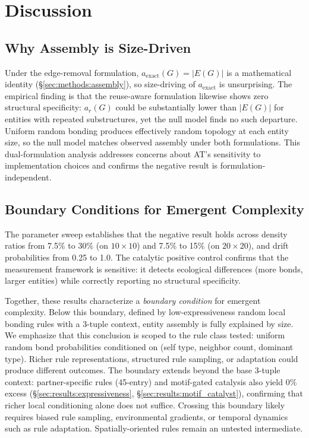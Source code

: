 \documentclass[letterpaper]{article}
\begin{document}
\section{Discussion}

\subsection{Why Assembly is Size-Driven}

Under the edge-removal formulation, $a_{\text{exact}}(G) = |E(G)|$ is
a mathematical identity (\S\ref{sec:methods:assembly}), so size-driving
of $a_{\text{exact}}$ is unsurprising. The empirical finding is that
the reuse-aware formulation likewise shows zero structural specificity:
$a_r(G)$ could be substantially lower than $|E(G)|$ for entities with
repeated substructures, yet the null model finds no such departure.
Uniform random bonding produces effectively random topology at each
entity size, so the null model matches observed assembly under both
formulations. This dual-formulation analysis addresses concerns about
AT's sensitivity to implementation choices
\citep{uthamacumaran2024assembly} and confirms the negative result is
formulation-independent.

\subsection{Boundary Conditions for Emergent Complexity}

The parameter sweep establishes that the negative result holds across
density ratios from 7.5\% to 30\% (on $10 \times 10$) and 7.5\% to
15\% (on $20 \times 20$), and drift probabilities from 0.25 to 1.0. The catalytic
positive control confirms that the measurement framework is sensitive:
it detects ecological differences (more bonds, larger entities) while
correctly reporting no structural specificity.

Together, these results characterize a \emph{boundary condition} for
emergent complexity. Below this boundary, defined by low-expressiveness
random local bonding rules with a 3-tuple context, entity assembly is
fully explained by size. We emphasize that this conclusion is scoped to
the rule class tested: uniform random bond probabilities conditioned on
(self type, neighbor count, dominant type). Richer rule representations,
structured rule sampling, or adaptation could produce different outcomes.
The boundary extends beyond the base 3-tuple context: partner-specific
rules (45-entry) and motif-gated catalysis also yield 0\% excess
(\S\ref{sec:results:expressiveness}, \S\ref{sec:results:motif_catalyst}),
confirming that richer local conditioning alone does not suffice.
Crossing this boundary likely requires biased rule sampling,
environmental gradients, or temporal dynamics such as rule adaptation.
Spatially-oriented rules remain an untested intermediate.
\end{document}
